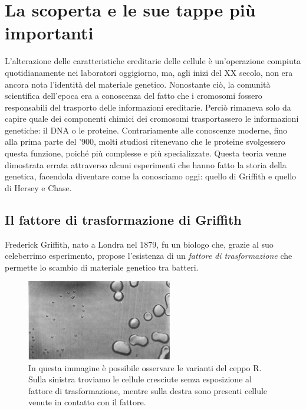 \documentclass[11pt]{report}
\begin{document}
	\chapter{La scoperta e le sue tappe più importanti}
	
	L'alterazione delle caratteristiche ereditarie delle cellule è un'operazione compiuta quotidianamente nei laboratori oggigiorno, ma, agli inizi del XX secolo, non era ancora nota l'identità del materiale genetico. Nonostante ciò, la comunità scientifica dell'epoca era a conoscenza del fatto che i cromosomi fossero responsabili del trasporto delle informazioni ereditarie. Perciò rimaneva solo da capire quale dei componenti chimici dei cromosomi trasportassero le informazioni genetiche: il DNA o le proteine. Contrariamente alle conoscenze moderne, fino alla prima parte del '900, molti studiosi ritenevano che le proteine svolgessero questa funzione, poiché più complesse e più specializzate. Questa teoria venne dimostrata errata attraverso alcuni esperimenti che hanno fatto la storia della genetica, facendola diventare come la conosciamo oggi: quello di Griffith e quello di Hersey e Chase.
	
	\section{Il fattore di trasformazione di Griffith} 
	
	Frederick Griffith, nato a Londra nel 1879, fu un biologo che, grazie al suo celeberrimo esperimento, propose l'esistenza di un \textit{fattore di trasformazione} che permette lo scambio di materiale genetico tra batteri.
	\begin{figure}
	 	\includegraphics[width=2.5in]{pneumococco r.jpg}
	 	\caption{{\small In questa immagine è possibile osservare le varianti del ceppo R. Sulla sinistra troviamo le cellule cresciute senza esposizione al fattore di trasformazione, mentre sulla destra sono presenti cellule venute in contatto con il fattore.}\cite{o2008isolating}}
	 \end{figure}
 
\end{document}
